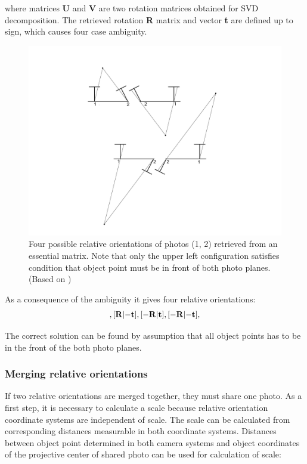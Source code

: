 \documentclass[a4paper,12pt]{article}
\newcommand{\ematr}[1]{%
{\bf #1}%
}
\newcommand{\evect}[1]{%
{\bf #1}%
}
\begin{document}
where matrices \ematr{U} and \ematr{V} are two rotation matrices  obtained for SVD decomposition.
The retrieved rotation \ematr{R} matrix and vector \evect{t} are defined up to sign,
which causes four case ambiguity. 

\begin{figure}[!h]
    \centering
    \includegraphics[scale=0.13]{figures/eo_ambiguity.png}
    \caption{Four possible relative orientations of photos (1, 2) retrieved from an essential matrix.
    Note that only the upper left configuration satisfies condition that object point 
    must be in front of both photo planes. (Based on \cite[p. 19]{pietzsch2001robot})}
    \label{fig:eo_amv}
\end{figure}

As a consequence of the  ambiguity it gives four relative orientations: 
\begin{equation}
[\ematr{R}|\evect{t}],
[\ematr{R}|\evect{-t}],
[\ematr{-R}|\evect{t}],
[\ematr{-R}|\evect{-t}],
\end{equation}

The correct solution can be found   by assumption that all object points has to be in the front
of the both photo planes.

\subsubsection{Merging relative orientations}
\label{sec:ess_chain}


If two relative orientations are merged together, they must share one photo.
As a first step, it is necessary to calculate a scale \cite{pietzsch2001robot}
because relative orientation coordinate systems are independent of scale.
The scale can be calculated from corresponding distances measurable in  both coordinate systems. 
Distances between object point determined in both camera systems and object coordinates of the projective center of shared photo 
can be used for calculation of scale:
\end{document}
